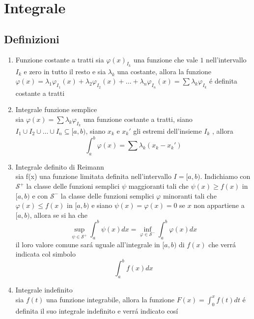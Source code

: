 \documentclass{exam}
\begin{document}
\section{Integrale}
	\subsection{Definizioni}
		\begin{enumerate}
			\item{Funzione costante a tratti}
				sia $\varphi(x)_{I_{k}}$ una funzione che vale $1$ nell'intervallo $I_{k}$ e zero in tutto il resto e sia $\lambda_{k}$ una costante, allora la funzione $\varphi(x)=\lambda_{1}\varphi_{I_{1}}(x)+\lambda_{2}\varphi_{I_{2}}(x)+\dots+\lambda_{n}\varphi_{I_{n}}(x)=\sum\lambda_{k}\varphi_{I_{k}}$ \'e definita costante a tratti
			\item{Integrale funzione semplice}\\
				sia $\varphi(x)=\sum\lambda_{k}\varphi_{I_{k}}$ una funzione costante a tratti, siano $I_1 \cup I_2 \cup \dots \cup I_n \subseteq [a,b)$,  siano $x_{k}$ e $x_{k}'$ gli estremi dell'insieme $I_{k}$ , allora 
				\begin{equation}
					\int_a^b \varphi(x)=\sum \lambda_{k}(x_{k}-x_{k}')
				\end{equation}
			\item{Integrale definito di Reimann}\\
				sia f(x) una funzione limitata definita nell'intervallo $I=[a,b)$. Indichiamo con $\mathscr{S}^+$ la classe delle funzioni semplici $\psi$ maggioranti tali che $\psi(x)\geq f(x)$ in $[a,b)$ e con $\mathscr{S}^-$ la classe delle funzioni semplici $\varphi$ minoranti tali che $\varphi(x)\le f(x)$ in $[a,b)$ e siano $\psi(x)=\varphi(x)=0$ se $x$ non appartiene a $[a,b)$, allora se si ha che 
				\begin{equation}
					\sup_{\psi\in\mathscr{S}^+}\int_a^b \psi(x)dx=\inf_{\varphi\in\mathscr{S}^-}\int_a^b \varphi(x)dx
				\end{equation}
				il loro valore comune sar\'a uguale all'integrale in $[a,b)$ di $f(x)$ che verr\'a indicata col simbolo
				\begin{equation}
					\int_a^b f(x)dx
				\end{equation}
			\item{Integrale indefinito}\\
				sia $f(t)$ una funzione integrabile, allora la funzione \(\displaystyle F(x)=\int_0^x f(t)dt\) \'e definita il suo integrale indefinito e verr\'a indicato cos\'i

\end{enumerate}
\end{document}
